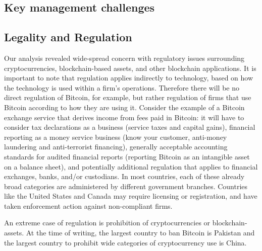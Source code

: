 \subsection{Key management challenges}

\subsection{Legality and Regulation}

Our analysis revealed wide-spread concern with regulatory issues surrounding cryptocurrencies, blockchain-based assets, and other blockchain applications. It is important to note that regulation applies indirectly to technology, based on how the technology is used within a firm's operations. Therefore there will be no direct regulation of Bitcoin, for example, but rather regulation of firms that use Bitcoin according to how they are using it. Consider the example of a Bitcoin exchange service that derives income from fees paid in Bitcoin: it will have to consider tax declarations as a business (\eg service taxes and capital gains), financial reporting as a money service business (\eg know your customer, anti-money laundering and anti-terrorist financing), generally acceptable accounting standards for audited financial reports (\eg reporting Bitcoin as an intangible asset on a balance sheet), and potentially additional regulation that applies to financial exchanges, banks, and/or custodians. In most countries, each of these already broad categories are administered by different government branches. Countries like the United States and Canada may require licensing or registration, and have taken enforcement action against non-compliant firms.

An extreme case of regulation is prohibition of cryptocurrencies or blockchain-assets. At the time of writing, the largest country to ban Bitcoin is Pakistan and the largest country to prohibit wide categories of cryptocurrency use is China.
 
 

